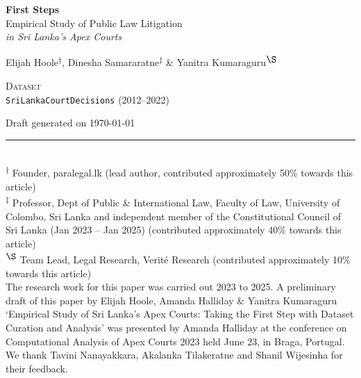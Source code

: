 \begin{titlepage}
\thispagestyle{empty}
\begin{center}
{\huge\bfseries First Steps\\[0.2cm]}
{\Large Empirical Study of Public Law Litigation\\[0.35cm]}
{\large\itshape in Sri Lanka's Apex Courts\\[1.2cm]}

{\large Elijah Hoole\textsuperscript{$\dagger$}, Dinesha Samararatne\textsuperscript{$\ddagger$} \& Yanitra Kumaraguru\textsuperscript{$\S$}\\[0.8cm]}

{\small\scshape Dataset}\\[0.25cm]
{\large\texttt{SriLankaCourtDecisions} (2012--2022)\\[1cm]}

{\small Draft generated on \today}
\end{center}
\vfill

\noindent\rule{\textwidth}{0.4pt}\\[0.3cm]
{\footnotesize
\textsuperscript{$\dagger$} Founder, paralegal.lk (lead author, contributed approximately 50\% towards this article)\\[0.15cm]
\textsuperscript{$\ddagger$} Professor, Dept of Public \& International Law, Faculty of Law, University of Colombo, Sri Lanka and independent member of the Constitutional Council of Sri Lanka (Jan 2023 -- Jan 2025) (contributed approximately 40\% towards this article)\\[0.15cm]
\textsuperscript{$\S$} Team Lead, Legal Research, Verité Research (contributed approximately 10\% towards this article)\\[0.3cm]
The research work for this paper was carried out 2023 to 2025. A preliminary draft of this paper by Elijah Hoole, Amanda Halliday \& Yanitra Kumaraguru `Empirical Study of Sri Lanka's Apex Courts: Taking the First Step with Dataset Curation and Analysis' was presented by Amanda Halliday at the conference on Computational Analysis of Apex Courts 2023 held June 23, in Braga, Portugal. We thank Tavini Nanayakkara, Akalanka Tilakeratne and Shanil Wijesinha for their feedback.
}
\end{titlepage}
\setcounter{page}{1}
